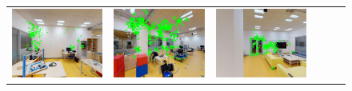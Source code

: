 \documentclass[twoside]{ctuthesis}
\theoremstyle{plain}
\theoremstyle{definition}
\theoremstyle{note}
\begin{document}
{\begin{figure}
{\begin{tabular}{c|c|c|c|c|c}
	\includegraphics[width=\thiswidth]{evaluation/queryPipeline/3.jpg/chosen_cutout_19_90_0} & 
    \includegraphics[width=\thiswidth]{evaluation/queryPipeline/6.jpg/chosen_cutout_2_90_0} & 
    \includegraphics[width=\thiswidth]{evaluation/queryPipeline/31.jpg/chosen_cutout_4_30_0} & 

\end{tabular}}
\end{figure}}
\end{document}
